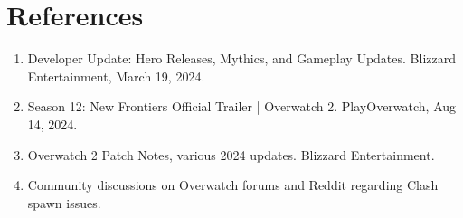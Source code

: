 \documentclass[12pt]{article}
\begin{document}
\appendix
\section{References}
\begin{enumerate}
    \item Developer Update: Hero Releases, Mythics, and Gameplay Updates. Blizzard 
    Entertainment, March 19, 2024.
    \item Season 12: New Frontiers Official Trailer | Overwatch 2. PlayOverwatch, Aug 14, 2024.
    \item Overwatch 2 Patch Notes, various 2024 updates. Blizzard Entertainment.
    \item Community discussions on Overwatch forums and Reddit regarding Clash spawn 
    issues. 
\end{enumerate}
\end{document}

